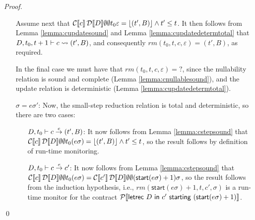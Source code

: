 \documentclass[orivec,final]{llncs-href}
\newcommand{\tracestart}{\mathsf{start}}
\newcommand{\lift}[1]{\lfloor #1 \rfloor}
\newcommand{\trace}{\sigma}
\newcommand{\emptytrace}{\varepsilon}
\newcommand{\inconclusive}{\mathrm{?}}
\newcommand{\ccontract}[3]{\mathsf{letrec}\ #1\ \mathsf{in}\ #2\
  \mathsf{starting}\ #3}
\begin{document}
\begin{proof}
\begin{itemize}
    Assume next that
    $\cdenclause{c}{\cdencontext{D}}{\emptyset}{\emptyset}{t_0}{\emptytrace}
    = \lift{(t',B)} \land t' \leq t$. It then follows from Lemma
    \ref{lemma:cupdatesound} and Lemma \ref{lemma:cupdatedetermtotal} that
    $D,t_0,t+1 \vdash c \leadsto (t',B)$, and consequently
    $\mathit{rm}(t_0,t,c,\emptytrace) = (t',B)$, as required.

    In the final case we must have that
    $\mathit{rm}(t_0,t,c,\emptytrace) = \inconclusive$, since the
    nullability relation is sound and complete (Lemma
    \ref{lemma:cnullablesound}), and the update relation is
    deterministic (Lemma \ref{lemma:cupdatedetermtotal}).

    \item[$\trace = e\trace'$:] Now, the small-step reduction relation
      is total and deterministic, so there are two cases:
      \begin{itemize}
      \item[$D, t_0 \vdash c \stackrel{e}{\rightarrow} (t',B)$:] It now follows from Lemma
        \ref{lemma:cstepsound} that
        $\cdenclause{c}{\cdencontext{D}}{\emptyset}{\emptyset}{t_0}{(e\trace)} 
        = \lift{(t',B)} \land t' \leq t$, so the result follows by
        definition of run-time monitoring.
      \item[$D, t_0 \vdash c \stackrel{e}{\rightarrow} c'$:] It now follows from Lemma
        \ref{lemma:cstepsound} that
        $\cdenclause{c}{\cdencontext{D}}{\emptyset}{\emptyset}{t_0}{(e\trace)}
        =
        \cdenclause{c'}{\cdencontext{D}}{\emptyset}{\emptyset}{(\tracestart(e\trace)+1)}{\trace}$,
        so the result follows from the induction hypothesis, i.e.,
        $\mathit{rm}(\tracestart(e\trace)+1,t,c',\trace)$ is a
        run-time monitor for the contract
        $\cdencontract{\ccontract{D}{c'}{(\tracestart(e\trace)+1)}}$.
      \end{itemize}
    \end{itemize}
  \qed
\end{proof}
\end{document}
